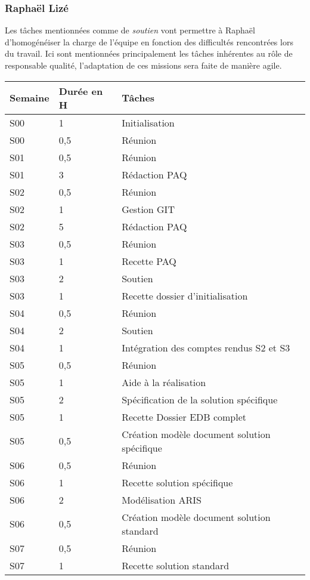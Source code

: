 \pagebreak
\subsubsection{Raphaël Lizé}

Les tâches mentionnées comme de \textsl{soutien} vont permettre à Raphaël d'homogénéiser
la charge de l'équipe en fonction des difficultés rencontrées lors du travail. 
Ici sont mentionnées principalement les tâches inhérentes au rôle de responsable qualité,
l'adaptation de ces missions sera faite de manière agile.

\begin{longtable}{|l|l|l|}
\hline
Semaine&Durée en H&Tâches\\
\hline
S00&1&Initialisation\\
\hline
S00&0,5&Réunion\\
\hline
S01&0,5&Réunion\\
\hline
S01&3&Rédaction PAQ\\
\hline
S02&0,5&Réunion\\
\hline
S02&1&Gestion GIT\\
\hline
S02&5&Rédaction PAQ\\
\hline
S03&0,5&Réunion\\
\hline
S03&1&Recette PAQ\\
\hline
S03&2&Soutien\\
\hline
S03&1&Recette dossier d'initialisation\\
\hline
S04&0,5&Réunion\\
\hline
S04&2&Soutien\\
\hline
S04&1&Intégration des comptes rendus S2 et S3\\
\hline
S05&0,5&Réunion\\
\hline
S05&1&Aide à la réalisation\\
\hline
S05&2&Spécification de la solution spécifique\\
\hline
S05&1&Recette Dossier EDB complet\\
\hline
S05&0,5&Création modèle document solution spécifique\\
\hline
S06&0,5&Réunion\\
\hline
S06&1&Recette solution spécifique\\
\hline
S06&2&Modélisation ARIS\\
\hline
S06&0,5&Création modèle document solution standard\\
\hline
S07&0,5&Réunion\\
\hline
S07&1&Recette solution standard\\

\end{longtable}
